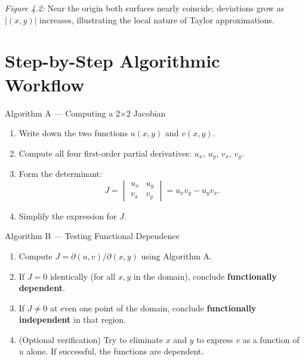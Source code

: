 \documentclass[12pt,a4paper]{article}
\begin{document}
\noindent\textit{Figure 4.2:} Near the origin both surfaces nearly coincide; deviations grow as \( |(x,y)| \) increases, illustrating the local nature of Taylor approximations.

\section{Step-by-Step Algorithmic Workflow}

\begin{infobox}{Algorithm A --- Computing a 2$\times$2 Jacobian}
\begin{enumerate}[leftmargin=*, label=\textbf{Step \arabic*.}]
  \item Write down the two functions \( u(x,y) \) and \( v(x,y) \).
  \item Compute all four first-order partial derivatives: \( u_x,\, u_y,\, v_x,\, v_y \).
  \item Form the determinant:
    \[
      J = \begin{vmatrix} u_x & u_y \\ v_x & v_y \end{vmatrix} = u_x v_y - u_y v_x.
    \]
  \item Simplify the expression for \( J \).
\end{enumerate}
\end{infobox}

\begin{infobox}{Algorithm B --- Testing Functional Dependence}
\begin{enumerate}[leftmargin=*, label=\textbf{Step \arabic*.}]
  \item Compute \( J = \partial(u,v)/\partial(x,y) \) using Algorithm A.
  \item If \( J = 0 \) identically (for all \( x,y \) in the domain), conclude \textbf{functionally dependent}.
  \item If \( J \neq 0 \) at even one point of the domain, conclude \textbf{functionally independent} in that region.
  \item (Optional verification) Try to eliminate \( x \) and \( y \) to express \( v \) as a function of \( u \) alone. If successful, the functions are dependent.
\end{enumerate}
\end{infobox}
\end{document}

